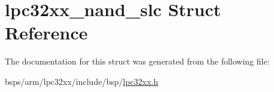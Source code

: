 \hypertarget{structlpc32xx__nand__slc}{}\section{lpc32xx\+\_\+nand\+\_\+slc Struct Reference}
\label{structlpc32xx__nand__slc}


The documentation for this struct was generated from the following file\+:\begin{DoxyCompactItemize}
\item 
bsps/arm/lpc32xx/include/bsp/\mbox{\hyperlink{lpc32xx_8h}{lpc32xx.\+h}}\end{DoxyCompactItemize}
